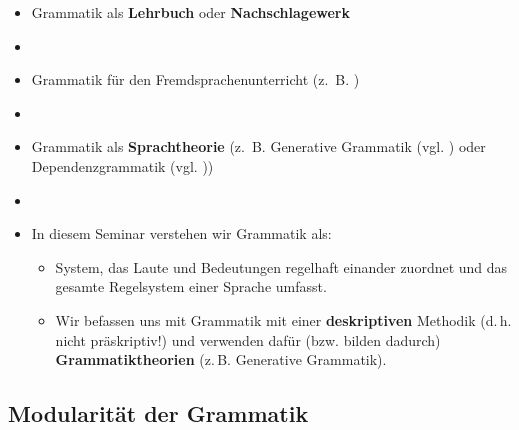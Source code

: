 \begin{frame}

\begin{itemize}
	\item<1-> Grammatik als \textbf{Lehrbuch} oder \textbf{Nachschlagewerk}
	\item[]
	\item<2-> Grammatik für den Fremdsprachenunterricht (z.~B. \citet{Helbig&Buscha05a})
	\item[]
	\item<3-> Grammatik als \textbf{Sprachtheorie} (z.~B. Generative Grammatik (vgl. \citet{Philippi&Tewes10a}) oder Dependenzgrammatik (vgl. \citet{Agel00a}))
	\item[]
	\item<4-> In diesem Seminar verstehen wir Grammatik als:

	\begin{itemize}
		\item<4-> System, das Laute und Bedeutungen regelhaft einander zuordnet und das gesamte Regelsystem einer Sprache umfasst.
		\item<4-> Wir befassen uns mit Grammatik mit einer \textbf{deskriptiven} Methodik (d.\,h. nicht präskriptiv!) und verwenden dafür (bzw. bilden dadurch) \textbf{Grammatiktheorien} (z.\,B. Generative Grammatik).
	\end{itemize}

\end{itemize}

\end{frame}


%
\subsection{Modularität der Grammatik}


